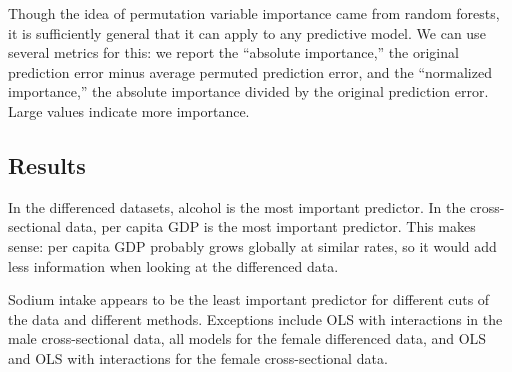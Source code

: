 \documentclass[11pt]{article}\usepackage[]{graphicx}\usepackage[]{color}
\begin{document}
Though the idea of permutation variable importance came from random forests, it is sufficiently general that it can apply to any predictive model. 
We can use several metrics for this: 
we report the ``absolute importance,'' the original prediction error minus average permuted prediction error, and the ``normalized importance,'' the absolute importance divided by the original prediction error. 
Large values indicate more importance.

\subsection{Results}
In the differenced datasets, alcohol is the most important predictor.
In the cross-sectional data, per capita GDP is the most important predictor.
This makes sense: per capita GDP probably grows globally at similar rates, so it would add less information when looking at the differenced data.

Sodium intake appears to be the least important predictor for different cuts of the data and different methods. 
Exceptions include OLS with interactions in the male cross-sectional data, all models for the female differenced data, and OLS and OLS with interactions for the female cross-sectional data.
\end{document}
